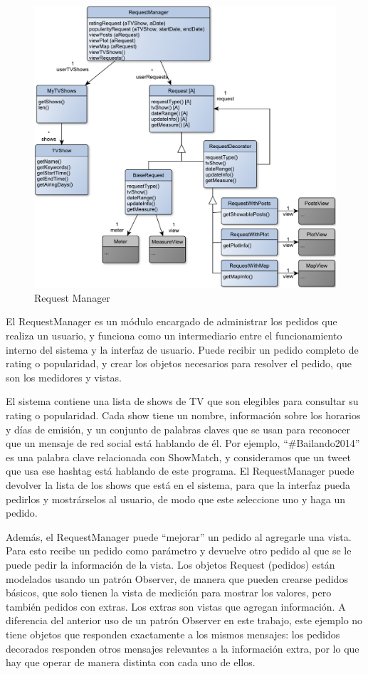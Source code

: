 \begin{figure}[H]
\centering
\includegraphics[width=\textwidth]{graph/clase/request.pdf}
\caption{Request Manager}
\end{figure}

El RequestManager es un módulo encargado de administrar los pedidos que realiza un usuario, y funciona como un intermediario entre el funcionamiento interno del sistema y la interfaz de usuario. Puede recibir un pedido completo de rating o popularidad, y crear los objetos necesarios para resolver el pedido, que son los medidores y vistas.

El sistema contiene una lista de shows de TV que son elegibles para consultar su rating o popularidad. Cada show tiene un nombre, información sobre los horarios y días de emisión, y un conjunto de palabras claves que se usan para reconocer que un mensaje de red social está hablando de él. Por ejemplo, ``\#Bailando2014'' es una palabra clave relacionada con ShowMatch, y consideramos que un tweet que usa ese hashtag está hablando de este programa. El RequestManager puede devolver la lista de los shows que está en el sistema, para que la interfaz pueda pedirlos y mostrárselos al usuario, de modo que este seleccione uno y haga un pedido.
\bigskip

Además, el RequestManager puede ``mejorar'' un pedido al agregarle una vista. Para esto recibe un pedido como parámetro y devuelve otro pedido al que se le puede pedir la información de la vista. Los objetos Request (pedidos) están modelados usando un patrón Observer, de manera que pueden crearse pedidos básicos, que solo tienen la vista de medición para mostrar los valores, pero también pedidos con extras. Los extras son vistas que agregan información. A diferencia del anterior uso de un patrón Observer en este trabajo, este ejemplo no tiene objetos que responden exactamente a los mismos mensajes: los pedidos decorados responden otros mensajes relevantes a la información extra, por lo que hay que operar de manera distinta con cada uno de ellos.


